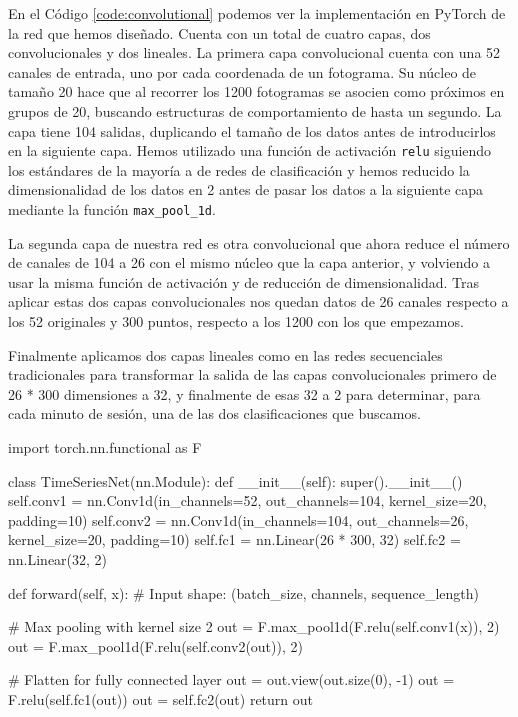 En el Código \ref{code:convolutional} podemos ver la implementación en PyTorch de la red que hemos diseñado. Cuenta con un total de cuatro capas, dos convolucionales y dos lineales. La primera capa convolucional cuenta con una 52 canales de entrada, uno por cada coordenada de un fotograma. Su núcleo de tamaño 20 hace que al recorrer los 1200 fotogramas se asocien como próximos en grupos de 20, buscando estructuras de comportamiento de hasta un segundo. La capa tiene 104 salidas, duplicando el tamaño de los datos antes de introducirlos en la siguiente capa. Hemos utilizado una función de activación \texttt{relu} siguiendo los estándares de la mayoría a de redes de clasificación y hemos reducido la dimensionalidad de los datos en 2 antes de pasar los datos a la siguiente capa mediante la función \texttt{max\_pool\_1d}.

La segunda capa de nuestra red es otra convolucional que ahora reduce el número de canales de 104 a 26 con el mismo núcleo que la capa anterior, y volviendo a usar la misma función de activación y de reducción de dimensionalidad. Tras aplicar estas dos capas convolucionales nos quedan datos de 26 canales respecto a los 52 originales y 300 puntos, respecto a los 1200 con los que empezamos.

Finalmente aplicamos dos capas lineales como en las redes secuenciales tradicionales para transformar la salida de las capas convolucionales primero de 26 * 300 dimensiones a 32, y finalmente de esas 32 a 2 para determinar, para cada minuto de sesión, una de las dos clasificaciones que buscamos.

\begin{mypython}[float={h}, caption=Red convolucional, label={code:convolutional}]
import torch.nn.functional as F

class TimeSeriesNet(nn.Module):
  def __init__(self):
    super().__init__()
    self.conv1 = nn.Conv1d(in_channels=52, out_channels=104,
                           kernel_size=20, padding=10)
    self.conv2 = nn.Conv1d(in_channels=104, out_channels=26,
                           kernel_size=20, padding=10)
    self.fc1 = nn.Linear(26 * 300, 32)
    self.fc2 = nn.Linear(32, 2)

  def forward(self, x):
    # Input shape: (batch_size, channels, sequence_length)

    # Max pooling with kernel size 2
    out = F.max_pool1d(F.relu(self.conv1(x)), 2)  
    out = F.max_pool1d(F.relu(self.conv2(out)), 2)

    # Flatten for fully connected layer
    out = out.view(out.size(0), -1)  
    out = F.relu(self.fc1(out))
    out = self.fc2(out)
    return out
\end{mypython}

